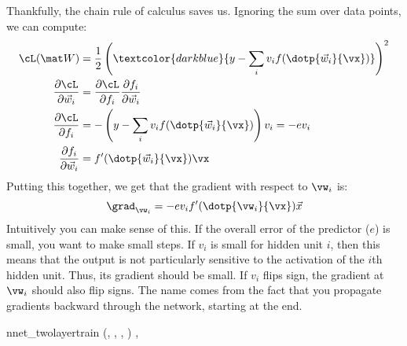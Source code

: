 Thankfully, the chain rule of calculus saves us.  Ignoring the sum
over data points, we can compute:
%
\begin{align}
\cL(\mat W) &= 
\frac 1 2 \left( \textcolor{darkblue}{y - 
     \sum_i v_i f(\dotp{\vec w_i}{\vx})}
     \right)^2
\\
\frac {\partial \cL} {\partial \vec w_i}
&= \frac {\partial \cL} {\partial f_i}
   \frac {\partial f_i}   {\partial \vec w_i}
\\
\frac {\partial \cL} {\partial f_i}
&= -\left(y - \sum_i v_i f(\dotp{\vec w_i}{\vx})\right) v_i
= -e v_i
\\
\frac {\partial f_i} {\partial \vec w_i}
&= f'(\dotp{\vec w_i}{\vx}) \vx
\end{align}
%
Putting this together, we get that the gradient with respect to
$\vw_i$ is:
%
\begin{equation}
\grad_{\vw_i}
= -e v_i f'(\dotp{\vw_i}{\vx}) \vec x
\end{equation}
%
Intuitively you can make sense of this.  If the overall error of the
predictor ($e$) is small, you want to make small steps.  If $v_i$ is
small for hidden unit $i$, then this means that the output is not
particularly sensitive to the activation of the $i$th hidden unit.
Thus, its gradient should be small.  If $v_i$ flips sign, the gradient
at $\vw_i$ should also flip signs.  The name
 comes from the fact that you propagate
gradients backward through the network, starting at the end.

\newalgorithm%
  {nnet_twolayertrain}%
  {(, \VAR{$\eta$}, , )}
  {
\ENDFOR
{}
\ENDFOR
\ENDFOR
{}
\ENDFOR
\RETURN {}, 
}

